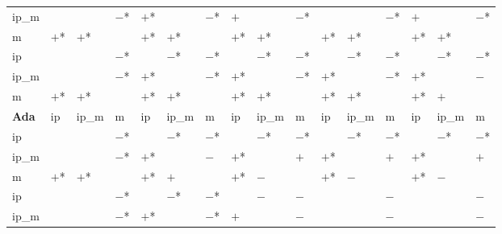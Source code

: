 \begin{table}[htbp]
{\begin{tabular}{l|lll|lll|lll|lll|lll}
ip\_m        &            &            & $-$*       & $+$*       &            & $-$*       & $+$        &            & $-$*       &            &            & $-$*       & $+$        &            & $-$*        \\
m            & $+$*       & $+$*       &            & $+$*       & $+$*       &            & $+$*       & $+$*       &            & $+$*       & $+$*       &            & $+$*       & $+$*       &             \\
\hline
\hline
ip           &            &            & $-$*       &            & $-$*       & $-$*       &            & $-$*       & $-$*       &            & $-$*       & $-$*       &            & $-$*       & $-$*        \\
ip\_m        &            &            & $-$*       & $+$*       &            & $-$*       & $+$*       &            & $-$*       & $+$*       &            & $-$*       & $+$*       &            & $-$         \\
m            & $+$*       & $+$*       &            & $+$*       & $+$*       &            & $+$*       & $+$*       &            & $+$*       & $+$*       &            & $+$*       & $+$        &             \\
\hline
\textbf{Ada} & ip         & ip\_m      & m          & ip         & ip\_m      & m          & ip         & ip\_m      & m          & ip         & ip\_m      & m          & ip         & ip\_m      & m           \\
\hline
ip           &            &            & $-$*       &            & $-$*       & $-$*       &            & $-$*       & $-$*       &            & $-$*       & $-$*       &            & $-$*       & $-$*        \\
ip\_m        &            &            & $-$*       & $+$*       &            & $-$        & $+$*       &            & $+$        & $+$*       &            & $+$        & $+$*       &            & $+$         \\
m            & $+$*       & $+$*       &            & $+$*       & $+$        &            & $+$*       & $-$        &            & $+$*       & $-$        &            & $+$*       & $-$        &             \\
\hline
\hline
ip           &            &            & $-$*       &            & $-$*       & $-$*       &            & $-$        & $-$        &            &            & $-$        &            &            & $-$         \\
ip\_m        &            &            & $-$*       & $+$*       &            & $-$*       & $+$        &            & $-$        &            &            & $-$        &            &            & $-$         \\

\end{tabular}}
\end{table}
